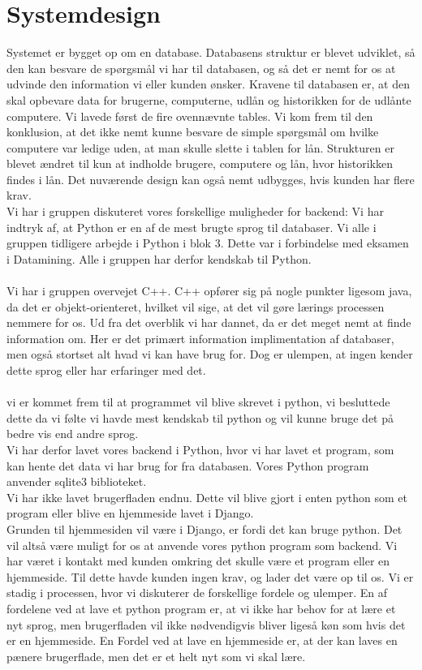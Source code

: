 \documentclass[a4paper]{article}
\begin{document}
\section{Systemdesign}
Systemet er bygget op om en database. Databasens struktur er blevet udviklet, så den kan besvare de spørgsmål vi har til databasen, og så det er nemt for os at udvinde den information vi eller kunden ønsker. Kravene til databasen er, at den skal opbevare data for brugerne, computerne, udlån og historikken for de udlånte computere. Vi lavede først de fire ovennævnte tables. Vi kom frem til den konklusion, at det ikke nemt kunne besvare de simple spørgsmål om hvilke computere var ledige uden, at man skulle slette i tablen for lån. Strukturen er blevet ændret til kun at indholde brugere, computere og lån, hvor historikken findes i lån. Det nuværende design kan også nemt udbygges, hvis kunden har flere krav. \\
Vi har i gruppen diskuteret vores forskellige muligheder for backend:
Vi har indtryk af, at Python er en af de mest brugte sprog til databaser. Vi alle i gruppen tidligere arbejde i Python i blok 3. Dette var i forbindelse med eksamen i Datamining. Alle i gruppen har derfor kendskab til Python.\\ \\
Vi har i gruppen overvejet C++. C++ opfører sig på nogle punkter ligesom java, da det er objekt-orienteret, hvilket vil sige, at det vil gøre lærings processen nemmere for os. Ud fra det overblik vi har dannet, da er det meget nemt at finde information om. Her er det primært information implimentation af databaser, men også stortset alt hvad vi kan have brug for. Dog er ulempen, at ingen kender dette sprog eller har erfaringer med det.\\ \\
vi er kommet frem til at programmet vil blive skrevet i python, vi besluttede dette da vi følte vi havde mest kendskab til python og vil kunne bruge det på bedre vis end andre sprog. \\
Vi har derfor lavet vores backend i Python, hvor vi har lavet et program, som kan hente det data vi har brug for fra databasen. Vores Python program anvender sqlite3 biblioteket. \\
Vi har ikke lavet brugerfladen endnu. Dette vil blive gjort i enten python som et program eller blive en hjemmeside lavet i Django.\\ Grunden til hjemmesiden vil være i Django, er fordi det kan bruge python. Det vil altså være muligt for os at anvende vores python program som backend. Vi har været i kontakt med kunden omkring det skulle være et program eller en hjemmeside. Til dette havde kunden ingen krav, og lader det være op til os. Vi er stadig i processen, hvor vi diskuterer de forskellige fordele og ulemper. En af fordelene ved at lave et python program er, at vi ikke har behov for at lære et nyt sprog, men brugerfladen vil ikke nødvendigvis bliver ligeså køn som hvis det er en hjemmeside. En Fordel ved at lave en hjemmeside er, at der kan laves en pænere brugerflade, men det er et helt nyt som vi skal lære. \\
\end{document}
